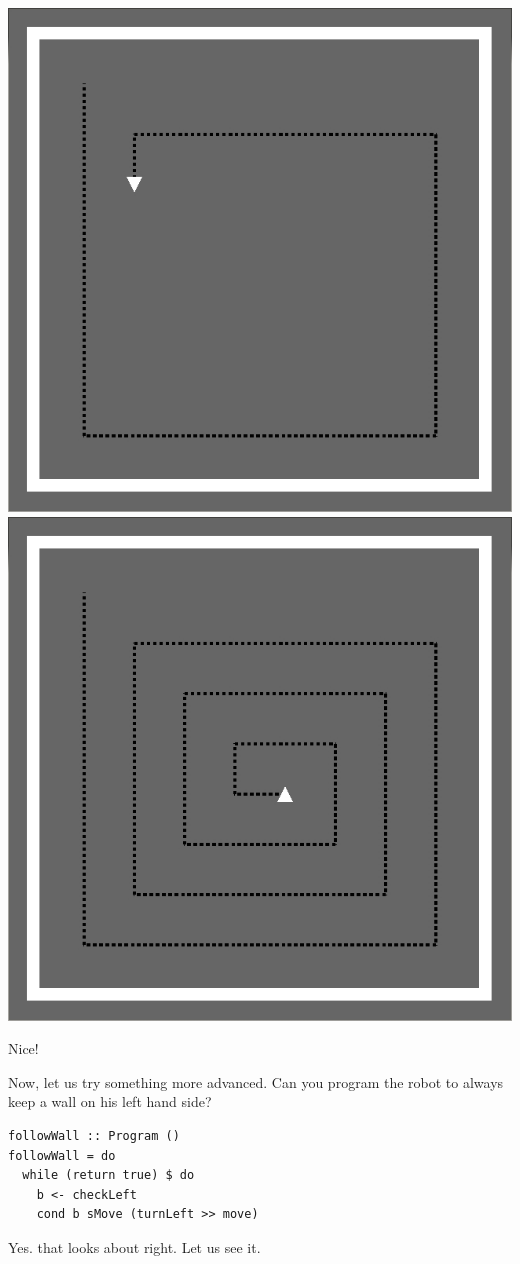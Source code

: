 \includegraphics[width=.49\linewidth]{./spiral1}
\includegraphics[width=.49\linewidth]{./spiral2}

\begin{dialogue} 

\speak{\docname{}} Nice! 

\speak{\docname{}} Now, let us try something more advanced. Can you program 
the robot to always keep a wall on his left hand side? 

\end{dialogue}  

\begin{small}
\begin{verbatim} 
followWall :: Program () 
followWall = do
  while (return true) $ do
    b <- checkLeft
    cond b sMove (turnLeft >> move) 
\end{verbatim}
\end{small}

\begin{dialogue} 
\speak{\docname{}} Yes. that looks about right. Let us see it. 
\end{dialogue}

